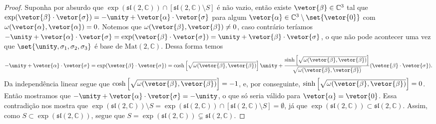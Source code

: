\begin{proof}
    Suponha por absurdo que \(\exp(\mathfrak{sl}(2,\mathbb{C})) \cap \left[\mathfrak{sl}(2,\mathbb{C})\setminus S\right]\) é não vazio, então existe \(\vetor{\beta} \in \mathbb{C}^3\) tal que \(\exp(\vetor{\beta}\cdot \vetor{\sigma}) = -\unity + \vetor{\alpha}\cdot\vetor{\sigma}\) para algum \(\vetor{\alpha} \in \mathbb{C}^3 \setminus \set{\vetor{0}}\) com \(\omega(\vetor{\alpha}, \vetor{\alpha}) = 0\). Notemos que \(\omega(\vetor{\beta},\vetor{\beta}) \neq 0\), caso contrário teríamos \(-\unity + \vetor{\alpha} \cdot \vetor{\sigma} = \exp(\vetor{\beta}\cdot \vetor{\sigma}) = \unity + \vetor{\beta}\cdot\vetor{\sigma}\), o que não pode acontecer uma vez que \(\set{\unity, \sigma_1, \sigma_2, \sigma_3}\) é base de \(\mathrm{Mat}(2, \mathbb{C})\). Dessa forma temos
    \begin{equation*}
        -\unity + \vetor{\alpha}\cdot\vetor{\sigma} = \exp(\vetor{\beta}\cdot \vetor{\sigma}) = \cosh\left[\sqrt{\omega(\vetor{\beta},\vetor{\beta})}\right] \unity + \frac{\sinh\left[\sqrt{\omega(\vetor{\beta}, \vetor{\beta})}\right]}{\sqrt{\omega(\vetor{\beta},\vetor{\beta})}}(\vetor{\beta}\cdot\vetor{\sigma}).
    \end{equation*}
    Da independência linear segue que \(\cosh\left[\sqrt{\omega(\vetor{\beta}, \vetor{\beta})}\right] = -1\), e, por conseguinte, \(\sinh\left[\sqrt{\omega(\vetor{\beta}, \vetor{\beta})}\right] = 0\). Então mostramos que \(-\unity + \vetor{\alpha} \cdot \vetor{\sigma} = -\unity\), o que só seria válido para \(\vetor{\alpha} = \vetor{0}\). Essa contradição nos mostra que \( \exp(\mathfrak{sl}(2,\mathbb{C})) \setminus S = \exp(\mathfrak{sl}(2,\mathbb{C})) \cap \left[\mathfrak{sl}(2,\mathbb{C})\setminus S\right] =\emptyset\), já que \(\exp(\mathfrak{sl}(2,\mathbb{C})) \subset \mathfrak{sl}(2,\mathbb{C})\). Assim, como \(S \subset \exp(\mathfrak{sl}(2,\mathbb{C}))\), segue que \(S = \exp(\mathfrak{sl}(2, \mathbb{C})) \subsetneq \mathfrak{sl}(2,\mathbb{C})\).
\end{proof}

